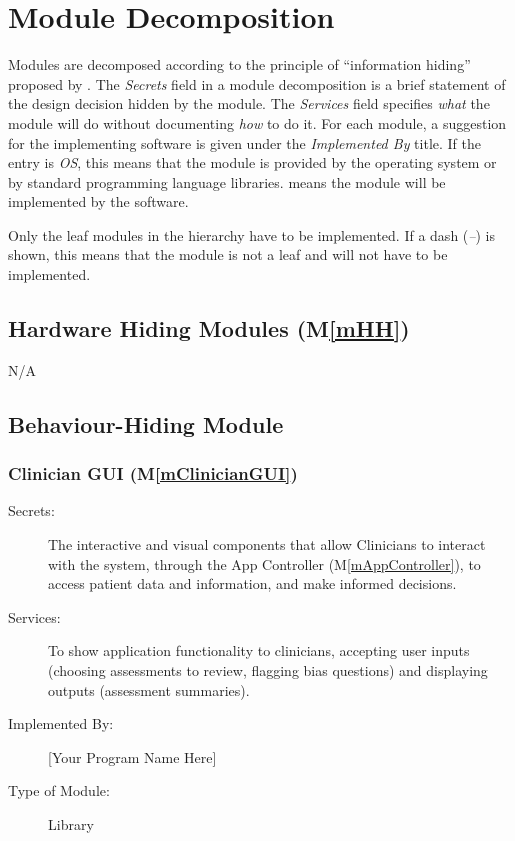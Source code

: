 \documentclass[12pt, titlepage]{article}
\newcommand{\mref}[1]{M\ref{#1}}
\begin{document}
\section{Module Decomposition} \label{SecMD}

Modules are decomposed according to the principle of ``information hiding''
proposed by \citet{ParnasEtAl1984}. The \emph{Secrets} field in a module
decomposition is a brief statement of the design decision hidden by the
module. The \emph{Services} field specifies \emph{what} the module will do
without documenting \emph{how} to do it. For each module, a suggestion for the
implementing software is given under the \emph{Implemented By} title. If the
entry is \emph{OS}, this means that the module is provided by the operating
system or by standard programming language libraries.  \emph{\progname{}} means the
module will be implemented by the \progname{} software.

Only the leaf modules in the hierarchy have to be implemented. If a dash
(\emph{--}) is shown, this means that the module is not a leaf and will not have
to be implemented.

\subsection{Hardware Hiding Modules (\mref{mHH})}
N/A

\subsection{Behaviour-Hiding Module}

\subsubsection{Clinician GUI (\mref{mClinicianGUI})}

\begin{description}
\item[Secrets:]The interactive and visual components that allow Clinicians to interact with the system, through the App Controller (\mref{mAppController}),
               to access patient data and information, and make informed decisions.
\item[Services:]To show application functionality to clinicians, accepting user inputs (choosing assessments to review,
                flagging bias questions) and displaying outputs (assessment summaries).
\item[Implemented By:] [Your Program Name Here]
\item[Type of Module:] Library
\end{description}
\end{document}
